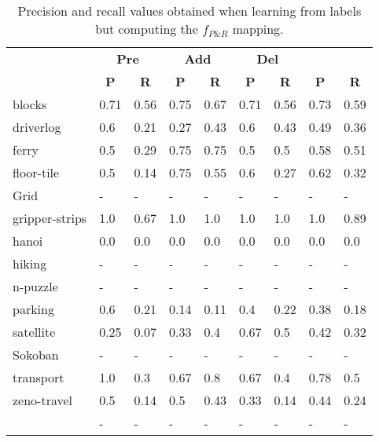 \documentclass{article}
\begin{document}
\begin{table}
	\begin{center}
		\begin{scriptsize}                
			\begin{tabular}{l|l|l|l|l|l|l||l|l|}
				& \multicolumn{2}{|c|}{\bf Pre} & \multicolumn{2}{|c|}{\bf Add} & \multicolumn{2}{|c||}{\bf Del} & \multicolumn{2}{|c}{\bf}\\ \cline{2-9}			
				& \multicolumn{1}{|c|}{\bf P} & \multicolumn{1}{|c|}{\bf R} & \multicolumn{1}{|c|}{\bf P} & \multicolumn{1}{|c|}{\bf R} & \multicolumn{1}{|c|}{\bf P} & \multicolumn{1}{|c||}{\bf R} &  \multicolumn{1}{|c|}{\bf P} & \multicolumn{1}{|c|}{\bf R} \\
				\hline
				blocks & 0.71 & 0.56 & 0.75 & 0.67 & 0.71 & 0.56 & 0.73 & 0.59 \\
				driverlog & 0.6 & 0.21 & 0.27 & 0.43 & 0.6 & 0.43 & 0.49 & 0.36 \\
				ferry & 0.5 & 0.29 & 0.75 & 0.75 & 0.5 & 0.5 & 0.58 & 0.51 \\
				floor-tile & 0.5 & 0.14 & 0.75 & 0.55 & 0.6 & 0.27 & 0.62 & 0.32 \\
				Grid & - & - & - & - & - & - & - & - \\ %
				gripper-strips & 1.0 & 0.67 & 1.0 & 1.0 & 1.0 & 1.0 & 1.0 & 0.89 \\
				hanoi & 0.0 & 0.0 & 0.0 & 0.0 & 0.0 & 0.0 & 0.0 & 0.0 \\
				hiking & - & - & - & - & - & - & - & - \\ %
				n-puzzle & - & - & - & - & - & - & - & - \\ %
				parking & 0.6 & 0.21 & 0.14 & 0.11 & 0.4 & 0.22 & 0.38 & 0.18 \\
				satellite & 0.25 & 0.07 & 0.33 & 0.4 & 0.67 & 0.5 & 0.42 & 0.32 \\
				Sokoban & - & - & - & - & - & - & - & - \\ %
				transport & 1.0 & 0.3 & 0.67 & 0.8 & 0.67 & 0.4 & 0.78 & 0.5 \\
				zeno-travel & 0.5 & 0.14 & 0.5 & 0.43 & 0.33 & 0.14 & 0.44 & 0.24 \\
				\hline
				\bf  & - & - & - & - & - & - & - & - \\
			\end{tabular}
		\end{scriptsize}
	\end{center}
	\caption{\small Precision and recall values obtained when learning from labels but computing the $f_{P\&R}$ mapping.}
	\label{fig:labels}                
\end{table}
\end{document}
